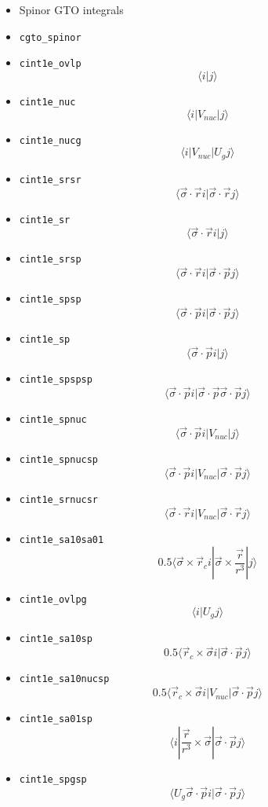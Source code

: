\documentclass{article}
\begin{document}
\begin{itemize}
\item
  Spinor GTO integrals
\item
  \verb!cgto_spinor!\\
\item
  \verb!cint1e_ovlp! \[\langle  i| j\rangle \]
\item
  \verb!cint1e_nuc! \[\langle  i| V_{nuc} |j\rangle \]
\item
  \verb!cint1e_nucg! \[\langle  i| V_{nuc} | U_gj\rangle \]
\item
  \verb!cint1e_srsr!
  \[\langle \vec{\sigma}\cdot\vec{r} i| \vec{\sigma}\cdot\vec{r}j\rangle \]
\item
  \verb!cint1e_sr! \[\langle \vec{\sigma}\cdot\vec{r} i|j\rangle \]
\item
  \verb!cint1e_srsp!
  \[\langle \vec{\sigma}\cdot\vec{r} i| \vec{\sigma}\cdot\vec{p}j\rangle \]
\item
  \verb!cint1e_spsp!
  \[\langle \vec{\sigma}\cdot\vec{p} i| \vec{\sigma}\cdot\vec{p}j\rangle \]
\item
  \verb!cint1e_sp! \[\langle \vec{\sigma}\cdot\vec{p} i|j\rangle \]
\item
  \verb!cint1e_spspsp!
  \[\langle \vec{\sigma}\cdot\vec{p} i| \vec{\sigma}\cdot\vec{p} \vec{\sigma}\cdot\vec{p}j\rangle \]
\item
  \verb!cint1e_spnuc!
  \[\langle \vec{\sigma}\cdot\vec{p} i| V_{nuc} |j\rangle \]
\item
  \verb!cint1e_spnucsp!
  \[\langle \vec{\sigma}\cdot\vec{p} i| V_{nuc} | \vec{\sigma}\cdot\vec{p}j\rangle \]
\item
  \verb!cint1e_srnucsr!
  \[\langle \vec{\sigma}\cdot\vec{r} i| V_{nuc} | \vec{\sigma}\cdot\vec{r}j\rangle \]
\item
  \verb!cint1e_sa10sa01!
  \[0.5\langle\vec{\sigma} \times \vec{r}_c i|\vec{\sigma} \times \frac{\vec{r}}{r^3} |j\rangle \]
\item
  \verb!cint1e_ovlpg! \[\langle i|U_g j\rangle \]
\item
  \verb!cint1e_sa10sp!
  \[0.5\langle\vec{r}_c \times\vec{\sigma} i| \vec{\sigma}\cdot\vec{p}j\rangle \]
\item
  \verb!cint1e_sa10nucsp!
  \[0.5\langle\vec{r}_c \times\vec{\sigma} i| V_{nuc} | \vec{\sigma}\cdot\vec{p}j\rangle \]
\item
  \verb!cint1e_sa01sp!
  \[\langle i| \frac{\vec{r}}{r^3} \times\vec{\sigma} | \vec{\sigma}\cdot\vec{p}j\rangle \]
\item
  \verb!cint1e_spgsp!
  \[\langle U_g \vec{\sigma}\cdot\vec{p} i| \vec{\sigma}\cdot\vec{p}j\rangle \]

\end{itemize}
\end{document}
